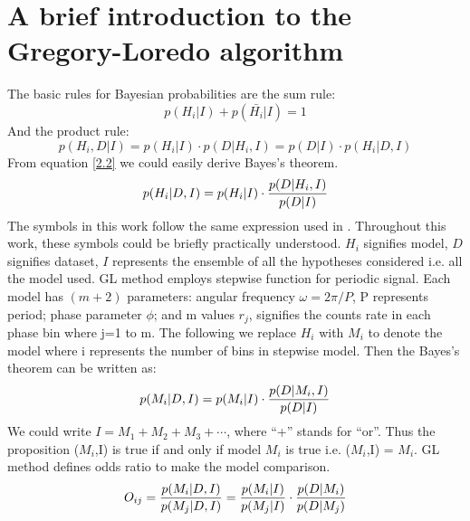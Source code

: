 \documentclass[fleqn,usenatbib]{mnras}
\begin{document}
\newpage
\onecolumn
\appendix
\section{A brief introduction to the Gregory-Loredo algorithm}\label{GL}
The basic rules for Bayesian probabilities are the sum rule:
\begin{equation}
p(H_i|I)+p(\bar{H_i}|I)	=1
\end{equation}
And the product rule:
\begin{equation}\label{2.2}
p(H_i,D|I)=p(H_i|I)\cdot p(D|H_i,I)=p(D|I)\cdot p(H_i|D,I)
\end{equation}
From equation \ref{2.2} we could easily derive Bayes's theorem.
\begin{equation}\label{2.5} 
p(H_i|D,I)=p(H_i|I)\cdot {p(D|H_i,I)\over p(D|I)}
\end{equation}
The symbols in this work follow the same expression used in \citep{1992ApJ...398..146G}. Throughout this work, these symbols could be briefly practically understood. $H_i$ signifies model, $D$ signifies dataset, $I$ represents the ensemble of all the hypotheses considered i.e. all the model used.
GL method employs stepwise function for periodic signal. Each model has $(m+2)$ parameters: angular frequency $\omega={2\pi/P}$, P represents period; phase parameter $\phi$; and m values $r_j$, signifies the counts rate in each phase bin where j=1 to m. The following we replace $H_i$ with $M_i$ to denote the model where i represents the number of bins in stepwise model. Then the Bayes's theorem can be written as:
 \begin{equation}\label{2.11}
 p(M_i|D,I)=p(M_i|I)\cdot {p(D|M_i,I)\over p(D|I)}
 \end{equation} 
We could write $I=M_1+M_2+M_3+\cdots$, where ``+'' stands for ``or''. Thus the proposition ($M_i$,I) is true if and only if model $M_i$ is true i.e. ($M_i$,I) = $M_i$. GL method defines odds ratio to make the model comparison.
\begin{equation}\label{2.12}
O_{ij}={p(M_i|D,I)\over p(M_j|D,I)}={p(M_i|I)\over p(M_j|I)}\cdot {p(D|M_i)\over p(D|M_j)}
\end{equation}
\end{document}
